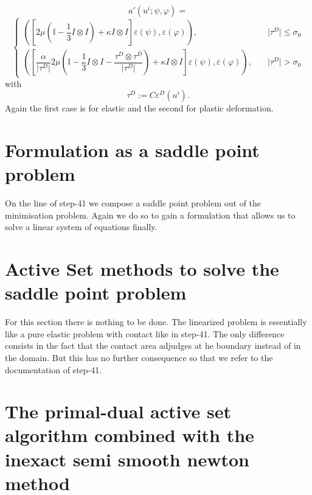 \documentclass{article}
\begin{document}
$$a'(u^i;\psi,\varphi) =$$
$$
\begin{cases}
\left(\left[2\mu\left(\mathbb{I}  - \dfrac{1}{3} I\otimes I\right) + \kappa I\otimes I\right]\varepsilon(\psi),\varepsilon(\varphi)\right), & \quad  \vert\tau^D\vert \leq \sigma_0\\
\left(\left[\dfrac{\alpha}{\vert\tau^D\vert}2\mu\left(\mathbb{I}  - \dfrac{1}{3} I\otimes I - \dfrac{\tau^D\otimes\tau^D}{\vert\tau^D\vert}\right) + \kappa I\otimes I\right]\varepsilon(\psi),\varepsilon(\varphi) \right), & \quad \vert\tau^D\vert > \sigma_0
\end{cases}
$$
with
$$\tau^D :=  C\varepsilon^D(u^i).$$
Again the first case is for elastic and the second for plastic deformation.

\section{Formulation as a saddle point problem}

On the line of step-41 we compose a saddle point problem out of the minimisation problem. Again we do so to gain a formulation
that allows us to solve a linear system of equations finally.

\section{Active Set methods to solve the saddle point problem}

For this section there is nothing to be done. The linearized problem is essentially like a pure elastic problem with contact like in step-41. The only
difference consists in the fact that the contact area adjudges at he boundary instead of in the domain. But this has no further consequence
so that we refer to the documentation of step-41.

\section{The primal-dual active set algorithm combined with the inexact semi smooth newton method}
\end{document}
